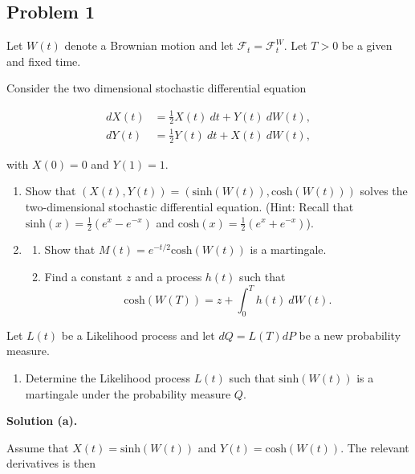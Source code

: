 \documentclass[
]{book}
\providecommand{\tightlist}{%
  \setlength{\itemsep}{0pt}\setlength{\parskip}{0pt}}
\begin{document}
\hypertarget{problem-1-2}{%
\subsection{Problem 1}\label{problem-1-2}}

Let \(W(t)\) denote a Brownian motion and let \(\mathcal{F}_t=\mathcal{F}_t^W\). Let \(T>0\) be a given and fixed time.

Consider the two dimensional stochastic differential equation

\begin{align*}
dX(t)&=\frac{1}{2}X(t)\ dt+Y(t)\ dW(t),\\
dY(t)&=\frac{1}{2}Y(t)\ dt+X(t)\ dW(t),
\end{align*}

with \(X(0)=0\) and \(Y(1)=1\).

\begin{enumerate}
\def\labelenumi{\alph{enumi}.}
\item
  Show that \((X(t),Y(t))=(\text{sinh}(W(t)),\text{cosh}(W(t)))\) solves the two-dimensional stochastic differential equation. (Hint: Recall that \(\text{sinh}(x)=\frac{1}{2}(e^x-e^{-x})\) and \(\text{cosh}(x)=\frac{1}{2}(e^x+e^{-x})\)).
\item
  \begin{enumerate}
  \def\labelenumii{\roman{enumii}.}
  \tightlist
  \item
    Show that \(M(t)=e^{-t/2}\text{cosh}(W(t))\) is a martingale.
  \item
    Find a constant \(z\) and a process \(h(t)\) such that
    \[
    \text{cosh}(W(T))=z+\int_0^Th(t)\ dW(t).
    \]
  \end{enumerate}
\end{enumerate}

Let \(L(t)\) be a Likelihood process and let \(dQ=L(T)dP\) be a new probability measure.

\begin{enumerate}
\def\labelenumi{\alph{enumi}.}
\setcounter{enumi}{2}
\tightlist
\item
  Determine the Likelihood process \(L(t)\) such that \(\text{sinh}(W(t))\) is a martingale under the probability measure \(Q\).
\end{enumerate}

\noindent\makebox[\linewidth]{\rule{\textwidth}{0.4pt}}

\textbf{Solution (a).}

Assume that \(X(t)=\text{sinh}(W(t))\) and \(Y(t)=\text{cosh}(W(t))\). The relevant derivatives is then
\end{document}
